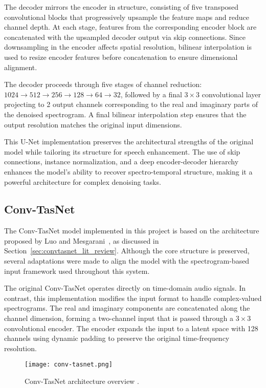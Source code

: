 The decoder mirrors the encoder in structure, consisting of five transposed convolutional blocks that progressively upsample the feature maps and reduce channel depth. At each stage, features from the corresponding encoder block are concatenated with the upsampled decoder output via skip connections. Since downsampling in the encoder affects spatial resolution, bilinear interpolation is used to resize encoder features before concatenation to ensure dimensional alignment.

The decoder proceeds through five stages of channel reduction: \(1024 \rightarrow 512 \rightarrow 256 \rightarrow 128 \rightarrow 64 \rightarrow 32\), followed by a final \(3 \times 3\) convolutional layer projecting to 2 output channels corresponding to the real and imaginary parts of the denoised spectrogram. A final bilinear interpolation step ensures that the output resolution matches the original input dimensions.

This U-Net implementation preserves the architectural strengths of the original model while tailoring its structure for speech enhancement. The use of skip connections, instance normalization, and a deep encoder-decoder hierarchy enhances the model’s ability to recover spectro-temporal structure, making it a powerful architecture for complex denoising tasks.

\subsection{Conv-TasNet}
\label{sec:convtasnet}

The Conv-TasNet model implemented in this project is based on the architecture proposed by Luo and Mesgarani~\cite{luo2019conv}, as discussed in Section~\ref{sec:convtasnet_lit_review}. Although the core structure is preserved, several adaptations were made to align the model with the spectrogram-based input framework used throughout this system.

The original Conv-TasNet operates directly on time-domain audio signals. In contrast, this implementation modifies the input format to handle complex-valued spectrograms. The real and imaginary components are concatenated along the channel dimension, forming a two-channel input that is passed through a \(3 \times 3\) convolutional encoder. The encoder expands the input to a latent space with 128 channels using dynamic padding to preserve the original time-frequency resolution.

\begin{figure}[h]
    \centering
    \texttt{[image: conv-tasnet.png]}
    \caption{\label{fig:convtasnet}Conv-TasNet architecture overview \cite{luo2019conv}.}
\end{figure}

